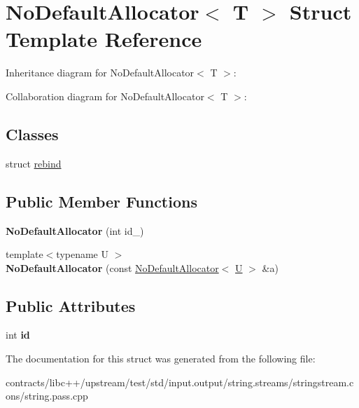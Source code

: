 \hypertarget{struct_no_default_allocator}{}\section{No\+Default\+Allocator$<$ T $>$ Struct Template Reference}
\label{struct_no_default_allocator}


Inheritance diagram for No\+Default\+Allocator$<$ T $>$\+:


Collaboration diagram for No\+Default\+Allocator$<$ T $>$\+:
\subsection*{Classes}
\begin{DoxyCompactItemize}
\item 
struct \mbox{\hyperlink{struct_no_default_allocator_1_1rebind}{rebind}}
\end{DoxyCompactItemize}
\subsection*{Public Member Functions}
\begin{DoxyCompactItemize}
\item 
\mbox{\label{struct_no_default_allocator_ae0d8865630ed52491a4ea41beee67181}} 
{\bfseries No\+Default\+Allocator} (int id\+\_\+)
\item 
\mbox{\label{struct_no_default_allocator_a6cee4ef3fe139be580592a0088eeff42}} 
{\footnotesize template$<$typename U $>$ }\\{\bfseries No\+Default\+Allocator} (const \mbox{\hyperlink{struct_no_default_allocator}{No\+Default\+Allocator}}$<$ \mbox{\hyperlink{union_u}{U}} $>$ \&a)
\end{DoxyCompactItemize}
\subsection*{Public Attributes}
\begin{DoxyCompactItemize}
\item 
\mbox{\label{struct_no_default_allocator_a198c417ebaab0451953094d56f7c24a2}} 
int {\bfseries id}
\end{DoxyCompactItemize}


The documentation for this struct was generated from the following file\+:\begin{DoxyCompactItemize}
\item 
contracts/libc++/upstream/test/std/input.\+output/string.\+streams/stringstream.\+cons/string.\+pass.\+cpp\end{DoxyCompactItemize}
